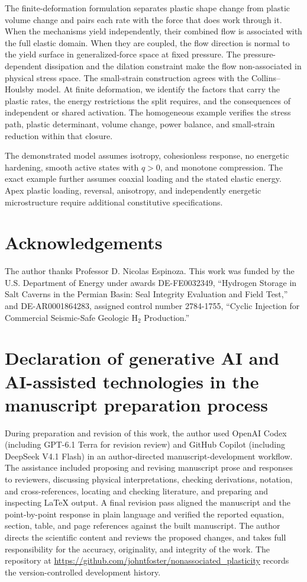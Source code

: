 \documentclass[11pt]{article}
\begin{document}
The finite-deformation formulation separates plastic shape change from
plastic volume change and pairs each rate with the force that does work
through it. When the mechanisms yield independently, their combined flow is
associated with the full elastic domain. When they are coupled, the flow
direction is normal to the yield surface in generalized-force space at fixed
pressure. The pressure-dependent dissipation and the dilation constraint make
the flow non-associated in physical stress space. The small-strain
construction agrees with the Collins--Houlsby model. At finite deformation, we
identify the factors that carry the plastic rates, the energy restrictions the
split requires, and the consequences of independent or shared activation. The
homogeneous example verifies the stress path, plastic determinant, volume
change, power balance, and small-strain reduction within that closure.

The demonstrated model assumes isotropy, cohesionless response, no energetic
hardening, smooth active states with \(q>0\), and monotone compression. The
exact example further assumes coaxial loading and the stated elastic energy.
Apex plastic loading, reversal, anisotropy, and independently energetic
microstructure require additional constitutive specifications.

\section*{Acknowledgements}

The author thanks Professor D. Nicolas Espinoza.  This work was funded by the
U.S. Department of Energy under awards DE-FE0032349, ``Hydrogen Storage in Salt
Caverns in the Permian Basin: Seal Integrity Evaluation and Field Test,'' and
DE-AR0001864283, assigned control number 2784-1755, ``Cyclic Injection for
Commercial Seismic-Safe Geologic H$_2$ Production.''

\section*{Declaration of generative AI and AI-assisted technologies in the manuscript preparation process}

During preparation and revision of this work, the author used OpenAI Codex
(including GPT-6.1 Terra for revision review) and GitHub Copilot (including
DeepSeek V4.1 Flash) in an author-directed manuscript-development workflow. The
assistance included proposing and revising manuscript prose and responses to
reviewers, discussing physical interpretations, checking derivations, notation,
and cross-references, locating and checking literature, and preparing and
inspecting \LaTeX{} output. A final revision pass aligned the manuscript and the
point-by-point response in plain language and verified the reported equation,
section, table, and page references against the built manuscript. The author
directs the scientific content and reviews the proposed changes, and takes full
responsibility for the accuracy, originality, and integrity of the work.
The repository at \url{https://github.com/johntfoster/nonassociated_plasticity}
records the version-controlled development history.



\end{document}
